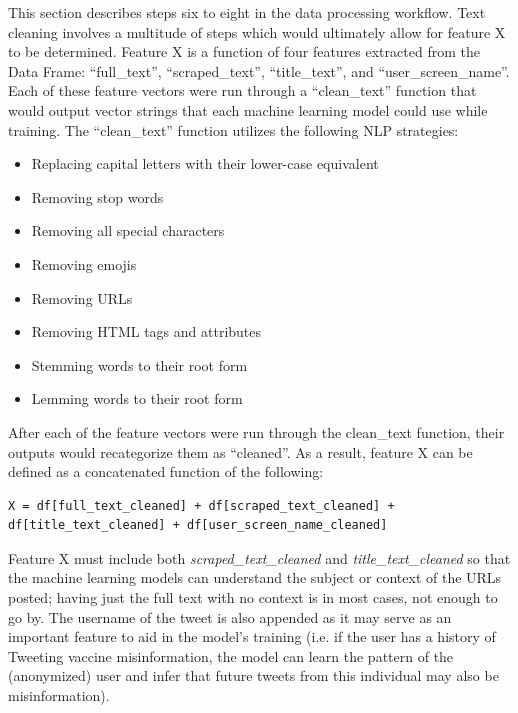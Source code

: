 \documentclass[12pt]{article}
\begin{document}
This section describes steps six to eight in the data processing workflow.
Text cleaning involves a multitude of steps which would ultimately allow for feature X to be determined.  Feature X is a function of four features extracted from the Data Frame: “full\_text”, “scraped\_text”, “title\_text”, and “user\_screen\_name”.  Each of these feature vectors were run through a “clean\_text” function that would output vector strings that each machine learning model could use while training.   The “clean\_text” function utilizes the following NLP strategies:

\begin{itemize}
\item Replacing capital letters with their lower-case equivalent
\item Removing stop words
\item Removing all special characters 
\item Removing emojis
\item Removing URLs
\item Removing HTML tags and attributes
\item Stemming words to their root form
\item Lemming words to their root form
\end{itemize}

After each of the feature vectors were run through the clean\_text function, their outputs would recategorize them as “cleaned”.  As a result, feature X can be defined as a concatenated function of the following:

\begin{verbatim} 
X = df[full_text_cleaned] + df[scraped_text_cleaned] +
df[title_text_cleaned] + df[user_screen_name_cleaned]
\end{verbatim}

Feature X must include both \textit{scraped\_text\_cleaned} and \textit{title\_text\_cleaned}  so that the machine learning models can understand the subject or context of the URLs posted; having just the full text with no context is in most cases, not enough to go by. The username of the tweet is also appended  as it may serve as an important feature to aid in the model’s training (i.e. if the user has a history of Tweeting vaccine misinformation, the model can learn the pattern of the (anonymized) user and infer that future tweets from this individual may also be misinformation).
\end{document}
